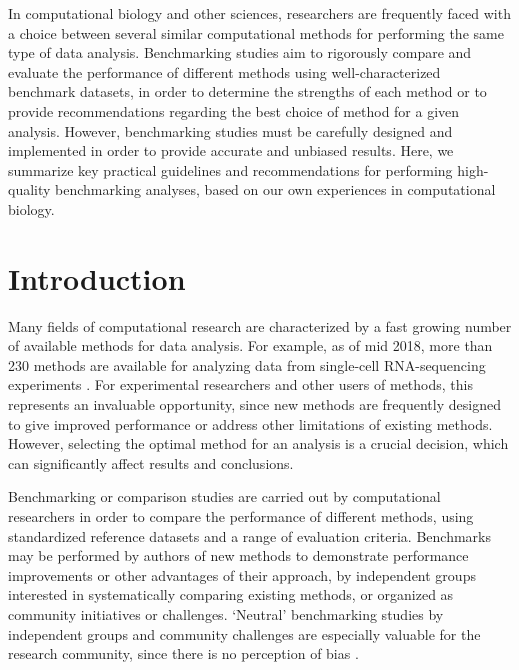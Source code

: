 \documentclass[12pt, a4paper]{article}
\begin{document}
In computational biology and other sciences, researchers are frequently faced with a choice between several similar computational methods for performing the same type of data analysis. Benchmarking studies aim to rigorously compare and evaluate the performance of different methods using well-characterized benchmark datasets, in order to determine the strengths of each method or to provide recommendations regarding the best choice of method for a given analysis. However, benchmarking studies must be carefully designed and implemented in order to provide accurate and unbiased results. Here, we summarize key practical guidelines and recommendations for performing high-quality benchmarking analyses, based on our own experiences in computational biology.




\section*{Introduction}

Many fields of computational research are characterized by a fast growing number of available methods for data analysis. For example, as of mid 2018, more than 230 methods are available for analyzing data from single-cell RNA-sequencing experiments \citep{Zappia2018}. For experimental researchers and other users of methods, this represents an invaluable opportunity, since new methods are frequently designed to give improved performance or address other limitations of existing methods. However, selecting the optimal method for an analysis is a crucial decision, which can significantly affect results and conclusions.

Benchmarking or comparison studies are carried out by computational researchers in order to compare the performance of different methods, using standardized reference datasets and a range of evaluation criteria. Benchmarks may be performed by authors of new methods to demonstrate performance improvements or other advantages of their approach, by independent groups interested in systematically comparing existing methods, or organized as community initiatives or challenges. `Neutral' benchmarking studies by independent groups and community challenges are especially valuable for the research community, since there is no perception of bias \citep{Boulesteix2018, Boulesteix2013}.
\end{document}
